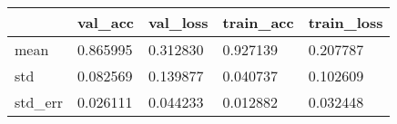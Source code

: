 \begin{tabular}{|l|l|l|l|l|}
\toprule \hline
 & val\_acc & val\_loss & train\_acc & train\_loss \\ \hline
\midrule
mean & 0.865995 & 0.312830 & 0.927139 & 0.207787 \\ \hline
std & 0.082569 & 0.139877 & 0.040737 & 0.102609 \\ \hline
std\_err & 0.026111 & 0.044233 & 0.012882 & 0.032448 \\ \hline
\bottomrule
\end{tabular}
